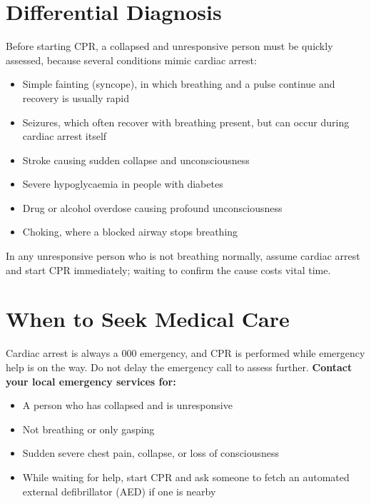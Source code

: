 \section*{Differential Diagnosis}
Before starting CPR, a collapsed and unresponsive person must be quickly assessed, because several conditions mimic cardiac arrest:
\begin{itemize}
    \item Simple fainting (syncope), in which breathing and a pulse continue and recovery is usually rapid
    \item Seizures, which often recover with breathing present, but can occur during cardiac arrest itself
    \item Stroke causing sudden collapse and unconsciousness
    \item Severe hypoglycaemia in people with diabetes
    \item Drug or alcohol overdose causing profound unconsciousness
    \item Choking, where a blocked airway stops breathing
\end{itemize}
In any unresponsive person who is not breathing normally, assume cardiac arrest and start CPR immediately; waiting to confirm the cause costs vital time.

\section*{When to Seek Medical Care}
Cardiac arrest is always a 000 emergency, and CPR is performed while emergency help is on the way. Do not delay the emergency call to assess further.
\textbf{Contact your local emergency services for:}
\begin{itemize}
    \item A person who has collapsed and is unresponsive
    \item Not breathing or only gasping
    \item Sudden severe chest pain, collapse, or loss of consciousness
    \item While waiting for help, start CPR and ask someone to fetch an automated external defibrillator (AED) if one is nearby
\end{itemize}

